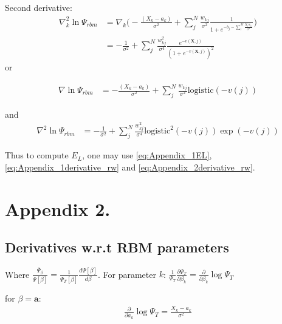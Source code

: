 \documentclass[%
oneside,                 %
final,                   %
10pt]{article}
\begin{document}
\begin{appendices}
Second derivative:
\begin{equation}
\begin{aligned}
\nabla_k^2  \ln \Psi_{rbm} &= \nabla_k  \big( 
   - \frac{(X_k - a_k)}{\sigma^2} + \sum_{j}^N \frac{w_{kj}}{\sigma^2}\frac{1}{1 + e^{-b_j  -\sum_i^M \frac{X_i w_{ij}}{\sigma^2}}}  \big) \\
  &=
 - \frac{1}{\sigma^2} + \sum_{j}^N \frac{w_{kj}^2}{\sigma^4}\frac{e^{-v(\bm X,j)}}{ ( 1 + e^{-v(\bm X,j)} )^2}  
\end{aligned}
\end{equation}
or

\begin{equation}
\begin{aligned}
\nabla \ln \Psi_{rbm}
&= - \frac{(X_k - a_k)}{\sigma^2} + \sum_{j}^N \frac{w_{kj}}{\sigma^2} \text {logistic} ( -v(j) ) 
\end{aligned}
\label{eq:Appendix_1derivative_rw}
\end{equation}

and
\begin{equation}
\begin{aligned}
\nabla^2 \ln \Psi_{rbm}
  &=
 - \frac{1}{\sigma^2} + \sum_{j}^N \frac{w_{kj}^2}{\sigma^4}  \text {logistic}^2 ( -v(j) ) \exp(-v(j))
\end{aligned}
\label{eq:Appendix_2derivative_rw}
\end{equation}

Thus to compute $E_L$, one may use \eqref{eq:Appendix_1EL}, \eqref{eq:Appendix_1derivative_rw} and \eqref{eq:Appendix_2derivative_rw}.









\section{Appendix 2.} \label{APP_2}
\subsection{Derivatives w.r.t RBM parameters}
Where $\frac{\bar \Psi_{\beta}}{\Psi [\beta]} = \frac{1}{\Psi_T [\beta]}\frac{d \Psi[\beta]}{d \beta}$. For parameter $k$: $\frac{1}{\Psi_T}\frac{\partial \Psi_T}{\partial \beta_k}=\frac{\partial}{\partial \beta_k} \log \Psi_T$

for $\beta=\bm a$:
\begin{equation}
\begin{aligned}
\frac{\partial}{\partial a_k} \log \Psi_T = \frac{X_k-a_k}{\sigma^2}
\end{aligned}
\label{eq:Appendix2_grad_a}
\end{equation}


\end{appendices}
\end{document}
